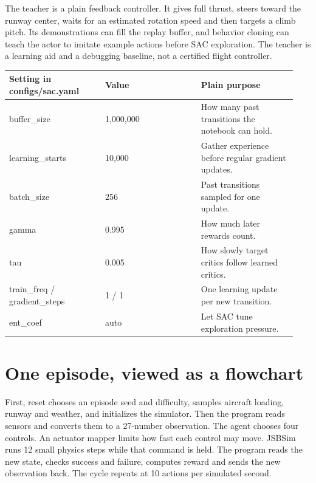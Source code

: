 \documentclass[11pt,a4paper]{article}
\begin{document}
The teacher is a plain feedback controller. It gives full thrust, steers toward the runway center, waits for an estimated rotation speed and then targets a climb pitch. Its demonstrations can fill the replay buffer, and behavior cloning can teach the actor to imitate example actions before SAC exploration. The teacher is a learning aid and a debugging baseline, not a certified flight controller.

\begin{longtable}{|p{0.313\linewidth}|p{0.313\linewidth}|p{0.313\linewidth}|}\hline
Setting in configs/sac.yaml & Value & Plain purpose \\ \hline
buffer\_size & 1,000,000 & How many past transitions the notebook can hold. \\ \hline
learning\_starts & 10,000 & Gather experience before regular gradient updates. \\ \hline
batch\_size & 256 & Past transitions sampled for one update. \\ \hline
gamma & 0.995 & How much later rewards count. \\ \hline
tau & 0.005 & How slowly target critics follow learned critics. \\ \hline
train\_freq / gradient\_steps & 1 / 1 & One learning update per new transition. \\ \hline
ent\_coef & auto & Let SAC tune exploration pressure. \\ \hline
\end{longtable}
\section{One episode, viewed as a flowchart}
First, reset chooses an episode seed and difficulty, samples aircraft loading, runway and weather, and initializes the simulator. Then the program reads sensors and converts them to a 27-number observation. The agent chooses four controls. An actuator mapper limits how fast each control may move. JSBSim runs 12 small physics steps while that command is held. The program reads the new state, checks success and failure, computes reward and sends the new observation back. The cycle repeats at 10 actions per simulated second.
\end{document}
